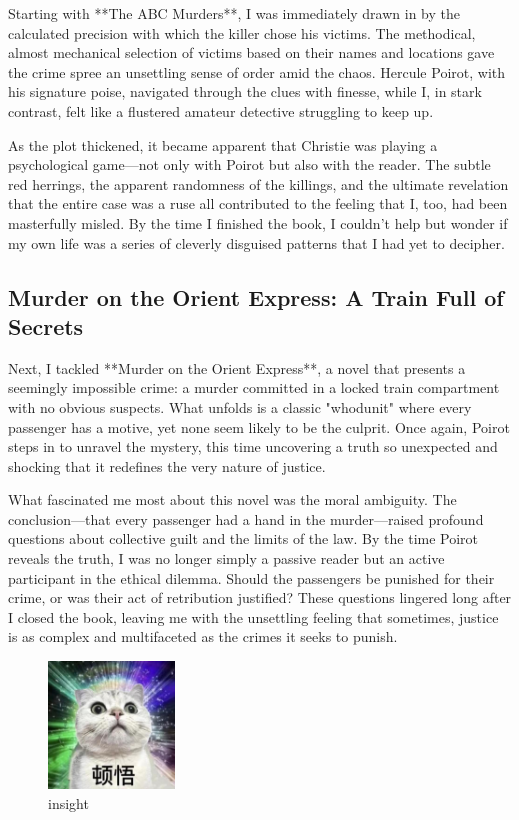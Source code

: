 \documentclass[a4paper]{article} 	%
\begin{document}
Starting with **The ABC Murders**, I was immediately drawn in by the calculated precision with which the killer chose his victims. The methodical, almost mechanical selection of victims based on their names and locations gave the crime spree an unsettling sense of order amid the chaos. Hercule Poirot, with his signature poise, navigated through the clues with finesse, while I, in stark contrast, felt like a flustered amateur detective struggling to keep up.

As the plot thickened, it became apparent that Christie was playing a psychological game—not only with Poirot but also with the reader. The subtle red herrings, the apparent randomness of the killings, and the ultimate revelation that the entire case was a ruse all contributed to the feeling that I, too, had been masterfully misled. By the time I finished the book, I couldn't help but wonder if my own life was a series of cleverly disguised patterns that I had yet to decipher.

\subsection*{Murder on the Orient Express: A Train Full of Secrets}

Next, I tackled **Murder on the Orient Express**, a novel that presents a seemingly impossible crime: a murder committed in a locked train compartment with no obvious suspects. What unfolds is a classic "whodunit" where every passenger has a motive, yet none seem likely to be the culprit. Once again, Poirot steps in to unravel the mystery, this time uncovering a truth so unexpected and shocking that it redefines the very nature of justice.

What fascinated me most about this novel was the moral ambiguity. The conclusion—that every passenger had a hand in the murder—raised profound questions about collective guilt and the limits of the law. By the time Poirot reveals the truth, I was no longer simply a passive reader but an active participant in the ethical dilemma. Should the passengers be punished for their crime, or was their act of retribution justified? These questions lingered long after I closed the book, leaving me with the unsettling feeling that sometimes, justice is as complex and multifaceted as the crimes it seeks to punish.

\begin{figure}[h!]
	\centering
	\includegraphics[width=0.3\textwidth]{fig006.jpg}  %
	\caption{insight}
	\label{fig:006}
\end{figure}
\end{document}
